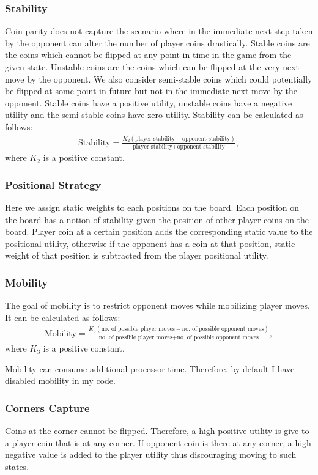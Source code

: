 \subsubsection*{Stability}
Coin parity does not capture the scenario where in the immediate next step taken by the opponent can alter the number of player coins drastically. Stable coins are the coins which cannot be flipped at any point in time in the game from the given state. Unstable coins are the coins which can be flipped at the very next move by the opponent. We also consider semi-stable coins which could potentially be flipped at some point in future but not in the immediate next move by the opponent. Stable coins have a positive utility, unstable coins have a negative utility and the semi-stable coins have zero utility. Stability can be calculated as follows:
\begin{align*}
	\text{Stability} = \frac{K_2(\text{player stability}-\text{opponent stability})}{\text{player stability}+\text{opponent stability}},
\end{align*}
where $K_2$ is a positive constant.
\subsubsection*{Positional Strategy}
Here we assign static weights to each positions on the board. Each position on the board has a notion of stability given the position of other player coins on the board. Player coin at a certain position adds the corresponding static value to the positional utility, otherwise if the opponent has a coin at that position, static weight of that position is subtracted from the player positional utility.
\subsubsection*{Mobility}
The goal of mobility is to restrict opponent moves while mobilizing player moves. It can be calculated as follows:
\begin{align*}
	\text{Mobility} = \frac{K_3(\text{no. of possible player moves}-\text{no. of possible opponent moves})}{\text{no. of possible player moves}+\text{no. of possible opponent moves}},
\end{align*}
where $K_3$ is a positive constant.

Mobility can consume additional processor time. Therefore, by default I have disabled mobility in my code.
\subsubsection*{Corners Capture}
Coins at the corner cannot be flipped. Therefore, a high positive utility is give to a player coin that is at any corner. If opponent coin is there at any corner, a high negative value is added to the player utility thus discouraging moving to such states.
